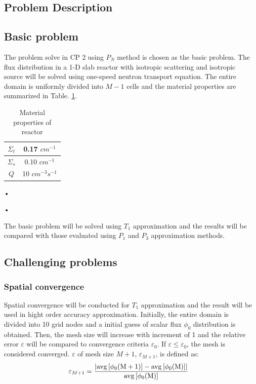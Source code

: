 \documentclass[11pt]{article}
\begin{document}
\begin{spacing}{1.5}
\section{Problem Description}
\subsection{Basic problem}
The problem solve in CP 2 using $P_N$ method is chosen as the basic problem. The flux distribution in a 1-D slab reactor with isotropic scattering and isotropic source will be solved using one-speed neutron transport equation. The entire domain is uniformly divided into $M-1$ cells and the material properties are summarized in Table. \ref{Material_properties}.
\begin{table}[!htbp]
\caption{Material properties of reactor}\label{Material_properties}
\centering
	\begin{tabular}{|c|c|}
		\hline
		$\Sigma_t$&0.17 $cm^{-1}$\\\hline
		$\Sigma_s$&0.10 $cm^{-1}$\\\hline
		$Q$ &10 $cm^{-3}s^{-1}$\\\hline

	\end{tabular}•
\end{table}•\par
The basic problem will be solved using $T_1$ approximation and the results will be compared with those evaluated using $P_1$ and $P_3$ approximation methods. 
\subsection{Challenging problems}
\subsubsection{Spatial convergence}
Spatial convergence will be conducted for $T_1$ approximation and the result will be used in hight order accuracy approximation. Initially, the entire domain is divided into 10 grid nodes and a initial guess of scalar flux $\phi_0$ distribution is obtained. Then, the mesh size will increase with increment of 1 and the relative error $\varepsilon$ will be compared to convergence criteria $\varepsilon_0$. If $\varepsilon\le\varepsilon_0$, the mesh is considered converged. $\varepsilon$ of mesh size $M+1$, $\varepsilon_{M+1}$, is defined as:
\[
\varepsilon_{M+1}=\frac{\left|\rm{avg}\left[\phi_0(M+1)\right]-\rm{avg}\left[\phi_0(M)\right]\right|}{\rm{avg}\left[\phi_0(M)\right]}
\]

\end{spacing}
\end{document}
